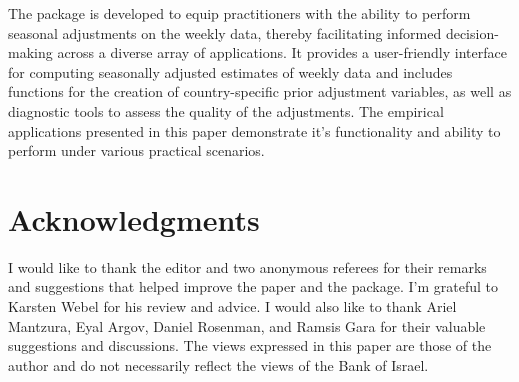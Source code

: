 The package  is developed to equip practitioners with the ability to perform seasonal adjustments on the weekly data, thereby facilitating informed decision-making across a diverse array of applications. It provides a user-friendly interface for computing seasonally adjusted estimates of weekly data and includes functions for the creation of country-specific prior adjustment variables, as well as diagnostic tools to assess the quality of the adjustments. The empirical applications presented in this paper demonstrate it's functionality and ability to perform under various practical scenarios.

\hypertarget{acknowledgments}{%
\section*{Acknowledgments}\label{acknowledgments}}

I would like to thank the editor and two anonymous referees for their remarks and suggestions that helped improve the paper and the package. I'm grateful to Karsten Webel for his review and advice. I would also like to thank Ariel Mantzura, Eyal Argov, Daniel Rosenman, and Ramsis Gara for their valuable suggestions and discussions. The views expressed in this paper are those of the author and do not necessarily reflect the views of the Bank of Israel.



\address{%
Tim Ginker\\
Bank of Israel\\%
Bank of Israel. POB 780, 91007, Jerusalem, Israel\\
%
%
\textit{ORCiD: \href{https://orcid.org/0000-0002-7138-5417}{0000-0002-7138-5417}}\\%
\href{mailto:timginker@gmail.com}{\nolinkurl{timginker@gmail.com}}%
}
